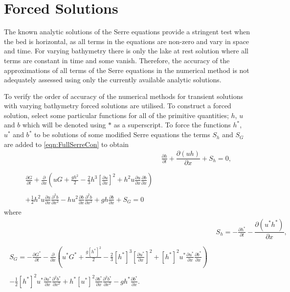\section{Forced Solutions}
The known analytic solutions of the Serre equations provide a stringent test when the bed is horizontal, as all terms in the equations are non-zero and vary in space and time. For varying bathymetry there is only the lake at rest solution where all terms are constant in time and some vanish. Therefore, the accuracy of the approximations of all terms of the Serre equations in the numerical method is not adequately assessed using only the currently available analytic solutions.

To verify the order of accuracy of the numerical methods for transient solutions with varying bathymetry forced solutions are utilised. To construct a forced solution, select some particular functions for all of the primitive quantities; $h$, $u$ and $b$ which will be denoted using $*$ as a superscript. To force the functions $h^*$, $u^*$ and $b^*$ to be solutions of some modified Serre equations the terms $S_h$ and $S_G$ are added to \eqref{eqn:FullSerreCon} to obtain
\begin{subequations}
	\label{eqn:FullSerreConForced}
	\begin{align}
	& \frac{\partial h}{\partial t} + \dfrac{\partial (uh)}{\partial x} + S_{h}  = 0 ,\label{eqn:FullSerreConMassForced}  \\ \nonumber \\
	\begin{split}
	\label{eqn:SerreconsconmomForced}
	\frac{\partial G}{\partial t}  + \frac{\partial}{\partial x} \left( {u} G + \frac{gh^2}{2} - \frac{2}{3}h^3 \left[ \frac{\partial {u}}{\partial x} \right]^2 + h^2 {u}\frac{\partial {u}}{\partial x}\frac{\partial b}{\partial x} \right) \\ \\ + \frac{1}{2}h^2 {u} \frac{\partial {u}}{\partial x} \frac{\partial^2 b}{\partial x^2}  - h {u}^2\frac{\partial b}{\partial x}\frac{\partial^2 b}{\partial x^2} + gh\frac{\partial b}{\partial x} + S_{G} = 0
	\end{split}
	\end{align}
\end{subequations}
where
\begin{align*}
&  S_{h} = -\frac{\partial h^*}{\partial t} - \dfrac{\partial (u^*h^*)}{\partial x} ,  \\ \nonumber \\
\begin{split}
S_{G} = -\frac{\partial G^*}{\partial t}  - \frac{\partial}{\partial x} \left( {u}^* G^* + \frac{g\left[h^*\right]^2}{2} - \frac{2}{3}\left[h^*\right]^3 \left[\frac{\partial {u}^*}{\partial x}\right]^2 + \left[h^*\right]^2 {u^*}\frac{\partial {u}^*}{\partial x}\frac{\partial b^*}{\partial x} \right) \\ \\ - \frac{1}{2}\left[h^*\right]^2 {u}^* \frac{\partial {u}^*}{\partial x} \frac{\partial^2 b^*}{\partial x^2}  + h^* {\left[u^*\right]}^2\frac{\partial b^*}{\partial x}\frac{\partial^2 b^*}{\partial x^2} - gh^*\frac{\partial b^*}{\partial x}.
\end{split}
\end{align*} 
